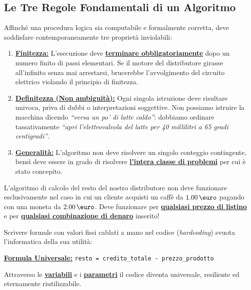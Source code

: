 \subsection{Le Tre Regole Fondamentali di un Algoritmo}

Affinché una procedura logica sia computabile e formalmente corretta, deve soddisfare contemporaneamente tre proprietà inviolabili:

\begin{enumerate}
  \item \textbf{\underline{Finitezza:}} L'esecuzione deve \textbf{\underline{terminare obbligatoriamente}} dopo un numero finito di passi elementari. Se il motore del distributore girasse all'infinito senza mai arrestarsi, brucerebbe l'avvolgimento del circuito elettrico violando il principio di finitezza.
  \item \textbf{\underline{Definitezza (Non ambiguità):}} Ogni singola istruzione deve risultare univoca, priva di dubbi o interpretazioni soggettive. Non possiamo istruire la macchina dicendo \emph{``versa un po' di latte caldo''}: dobbiamo ordinare tassativamente \emph{``apri l'elettrovalvola del latte per 40 millilitri a 65 gradi centigradi''}.
  \item \textbf{\underline{Generalità:}} L'algoritmo non deve risolvere un singolo conteggio contingente, bensì deve essere in grado di risolvere \textbf{\underline{l'intera classe di problemi}} per cui è stato concepito.
\end{enumerate}

\begin{attenzione}
L'algoritmo di calcolo del resto del nostro distributore non deve funzionare esclusivamente nel caso in cui un cliente acquisti un caffè da $1.00\,\text{\euro}$ pagando con una moneta da $2.00\,\text{\euro}$. Deve funzionare per \textbf{\underline{qualsiasi prezzo di listino}} e per \textbf{\underline{qualsiasi combinazione di denaro}} inserito!

\vspace{0.5em}
\noindent Scrivere formule con valori fissi cablati a mano nel codice (\emph{hardcoding}) svuota l'informatica della sua utilità:
\begin{center}
\textbf{\underline{Formula Universale:}} \quad \texttt{resto = credito\_totale - prezzo\_prodotto}
\end{center}
Attraverso le \textbf{\underline{variabili}} e i \textbf{\underline{parametri}} il codice diventa universale, resiliente ed eternamente riutilizzabile.
\end{attenzione}


